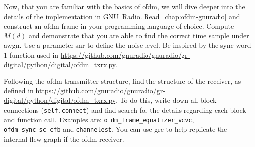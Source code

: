 Now, that you are familiar with the basics of \gls{ofdm}, we will dive deeper into the details of the implementation in GNU~Radio. Read~\cref{chap:ofdm-gnuradio} and construct an \gls{ofdm} frame in your programming language of choice. Compute $M(d)$ and demonstrate that you are able to find the correct time sample under \gls{awgn}. Use a parameter \gls{snr} to define the noise level. Be inspired by the sync word 1 function used in \url{https://github.com/gnuradio/gnuradio/gr-digital/python/digital/ofdm_txrx.py}.

Following the \gls{ofdm} transmitter structure, find the structure of the receiver, as defined in \url{https://github.com/gnuradio/gnuradio/gr-digital/python/digital/ofdm_txrx.py}. To do this, write down all block connections (\texttt{self.connect}) and find search for the details regarding each block and function call. Examples are: \texttt{ofdm_frame_equalizer_vcvc}, \texttt{ofdm_sync_sc_cfb} and \texttt{channelest}. You can use \gls{grc} to help replicate the internal flow graph if the \gls{ofdm} receiver.